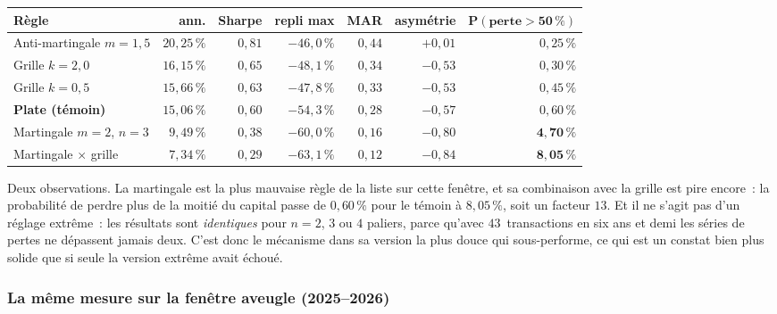 \begin{center}
\renewcommand{\arraystretch}{1.25}
\small
\begin{tabular}{lrrrrrr}
\toprule
\textbf{Règle} & \textbf{ann.} & \textbf{Sharpe} & \textbf{repli max} & \textbf{MAR} & \textbf{asymétrie} & $\mathbf{P(\text{perte}>50\,\%)}$ \\
\midrule
Anti-martingale $m{=}1{,}5$ & $20{,}25\,\%$ & $0{,}81$ & $-46{,}0\,\%$ & $0{,}44$ & $+0{,}01$ & $0{,}25\,\%$ \\
Grille $k{=}2{,}0$ & $16{,}15\,\%$ & $0{,}65$ & $-48{,}1\,\%$ & $0{,}34$ & $-0{,}53$ & $0{,}30\,\%$ \\
Grille $k{=}0{,}5$ & $15{,}66\,\%$ & $0{,}63$ & $-47{,}8\,\%$ & $0{,}33$ & $-0{,}53$ & $0{,}45\,\%$ \\
\textbf{Plate (témoin)} & $15{,}06\,\%$ & $0{,}60$ & $-54{,}3\,\%$ & $0{,}28$ & $-0{,}57$ & $0{,}60\,\%$ \\
Martingale $m{=}2$, $n{=}3$ & $9{,}49\,\%$ & $0{,}38$ & $-60{,}0\,\%$ & $0{,}16$ & $-0{,}80$ & $\mathbf{4{,}70\,\%}$ \\
Martingale $\times$ grille & $7{,}34\,\%$ & $0{,}29$ & $-63{,}1\,\%$ & $0{,}12$ & $-0{,}84$ & $\mathbf{8{,}05\,\%}$ \\
\bottomrule
\end{tabular}
\end{center}

Deux observations. La martingale est la plus mauvaise règle de la liste sur cette fenêtre, et sa combinaison avec la grille est pire encore~: la probabilité de perdre plus de la moitié du capital passe de $0{,}60\,\%$ pour le témoin à $8{,}05\,\%$, soit un facteur $13$. Et il ne s'agit pas d'un réglage extrême~: les résultats sont \emph{identiques} pour $n = 2$, $3$ ou $4$ paliers, parce qu'avec $43$~transactions en six ans et demi les séries de pertes ne dépassent jamais deux. C'est donc le mécanisme dans sa version la plus douce qui sous-performe, ce qui est un constat bien plus solide que si seule la version extrême avait échoué.

\subsubsection*{La même mesure sur la fenêtre aveugle (2025--2026)}

